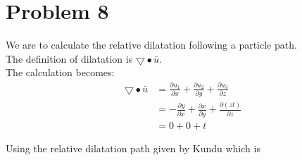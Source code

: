 \documentclass[11pt,a4paper,english]{article}
\numberwithin{equation}{section}
\begin{document}
\section{Problem 8}
We are to calculate the relative dilatation following a particle path. \\
The definition of dilatation is $\bigtriangledown \bullet \bar{u}$.	\\
The calculation becomes:
\begin{align*}
	\bigtriangledown \bullet \bar{u} &= 	
		\frac{\partial u_1}{\partial x} + \frac{\partial u_2}{\partial y} + \frac{\partial u_3}{\partial z}
	\\
	&= -\frac{\partial y}{\partial x} + \frac{\partial x}{\partial y} + \frac{\partial (zt)}{\partial z}
	\\
	&= 0 + 0 + t
\end{align*}

Using the relative dilatation path given by Kundu which is 
\end{document}
